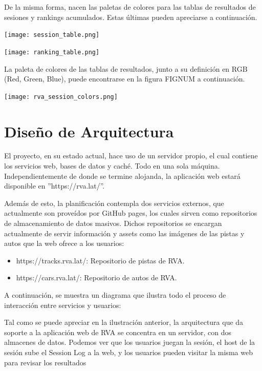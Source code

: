 De la misma forma, nacen las paletas de colores para las tablas de resultados de sesiones y rankings acumulados. Estas últimas pueden apreciarse a continuación.

\begin{center}
  \texttt{[image: session\_table.png]}
\end{center}

\begin{center}
  \texttt{[image: ranking\_table.png]}
\end{center}

La paleta de colores de las tablas de resultados, junto a su definición en RGB (Red, Green, Blue), puede encontrarse en la figura FIGNUM a continuación.

\begin{center}
  \texttt{[image: rva\_session\_colors.png]}
\end{center}

\section{Diseño de Arquitectura}
El proyecto, en su estado actual, hace uso de un servidor propio, el cual contiene los servicios web, bases de datos y caché. Todo en una sola máquina. Independientemente de donde se termine alojanda, la aplicación web estará disponible en ''https://rva.lat/''.

Además de esto, la planificación contempla dos servicios externos, que actualmente son proveídos por GitHub pages, los cuales sirven como repositorios de almacenamiento de datos masivos. Dichos repositorios se encargan actualmente de servir información y assets como las imágenes de las pistas y autos que la web ofrece a los usuarios:

\begin{itemize}
	\item https://tracks.rva.lat/: Repositorio de pistas de RVA.
	\item https://cars.rva.lat/: Repositorio de autos de RVA.
\end{itemize}

A continuación, se muestra un diagrama que ilustra todo el proceso de interacción entre servicios y usuarios:

Tal como se puede apreciar en la ilustración anterior, la arquitectura que da soporte a la aplicación web de RVA se concentra en un servidor, con dos almacenes de datos. Podemos ver que los usuarios juegan la sesión, el host de la sesión sube el Session Log a la web, y los usuarios pueden visitar la misma web para revisar los resultados

